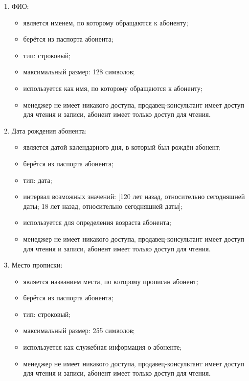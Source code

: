 \begin{enumerate}
\begin{enumerate}
        \item ФИО:
        \begin{itemize}
            \item является именем, по которому обращаются к абоненту;
            \item берётся из паспорта абонента;
            \item тип: строковый;
            \item максимальный размер: 128 символов; %
            \item используется как имя, по которому обращаются к абоненту;
            \item менеджер не имеет никакого доступа, продавец-консультант имеет доступ для чтения и записи, абонент имеет только доступ для чтения.
        \end{itemize}

        \item Дата рождения абонента:
        \begin{itemize}
            \item является датой календарного дня, в который был рождён абонент;
            \item берётся из паспорта абонента;
            \item тип: дата;
            \item интервал возможных значений: [120 лет назад, относительно сегодняшней даты; 18 лет назад, относительно сегодняшней даты];
            \item используется для определения возраста абонента;
            \item менеджер не имеет никакого доступа, продавец-консультант имеет доступ для чтения и записи, абонент имеет только доступ для чтения.
        \end{itemize}

        \item Место прописки:
        \begin{itemize}
            \item является названием места, по которому прописан абонент;
            \item берётся из паспорта абонента;
            \item тип: строковый;
            \item максимальный размер: 255 символов;
            \item используется как служебная информация о абоненте;
            \item менеджер не имеет никакого доступа, продавец-консультант имеет доступ для чтения и записи, абонент имеет только доступ для чтения.
        \end{itemize}
    \end{enumerate}


\end{enumerate}
